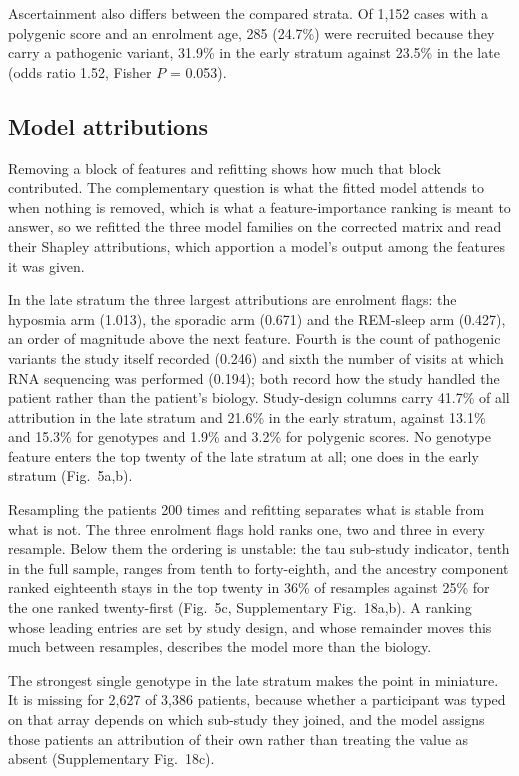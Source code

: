 \documentclass[10pt]{article}
\begin{document}
Ascertainment also differs between the compared strata. Of 1,152 cases with a polygenic score and
an enrolment age, 285 (24.7\%) were recruited because they carry a pathogenic variant, 31.9\% in
the early stratum against 23.5\% in the late (odds ratio 1.52, Fisher $P$ = 0.053).

\subsection*{Model attributions}

Removing a block of features and refitting shows how much that block contributed. The complementary question is what the
fitted model attends to when nothing is removed, which is what a feature-importance ranking is
meant to answer, so we refitted the three model families on the corrected matrix and read their Shapley attributions, which apportion a model's output among the features it was given.

In the late stratum the three largest attributions are enrolment flags: the hyposmia arm (1.013),
the sporadic arm (0.671) and the REM-sleep arm (0.427), an order of magnitude above the next
feature. Fourth is the count of pathogenic variants the study itself recorded (0.246) and sixth
the number of visits at which RNA sequencing was performed (0.194); both record how the study handled the patient rather than the patient's biology. Study-design columns carry
41.7\% of all attribution in the late stratum and 21.6\% in the early stratum, against 13.1\% and
15.3\% for genotypes and 1.9\% and 3.2\% for polygenic scores. No genotype feature enters the top
twenty of the late stratum at all; one does in the early stratum (Fig.~5a,b).

Resampling the patients 200 times and refitting separates what is stable from what is not. The
three enrolment flags hold ranks one, two and three in every resample. Below them the ordering is
unstable: the tau sub-study indicator, tenth in the full sample, ranges from tenth to
forty-eighth, and the ancestry component ranked eighteenth stays in the top twenty in 36\% of
resamples against 25\% for the one ranked twenty-first (Fig.~5c, Supplementary Fig.~18a,b). A ranking whose leading entries are set by study design, and whose remainder moves this much between resamples, describes the model more than the biology.

The strongest single genotype in the late stratum makes the point in miniature. It is missing for
2,627 of 3,386 patients, because whether a participant was typed on that array depends on which
sub-study they joined, and the model assigns those patients an attribution of their own rather
than treating the value as absent (Supplementary Fig.~18c).
\end{document}
